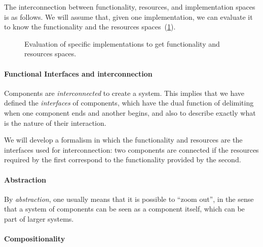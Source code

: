 The interconnection between functionality, resources, and implementation spaces
is as follows. We will assume that, given one implementation, we can evaluate it
to know the functionality and the resources spaces~(\cref{fig:FIR}).

\begin{figure}[h!]
    \centering
    \caption{Evaluation of specific implementations to get functionality and resources spaces.\label{fig:FIR}}
\end{figure}



\paragraph{Functional Interfaces and interconnection}

Components are \emph{interconnected} to create a system.
This implies that we have defined the \emph{interfaces} of components, which
have the dual function of delimiting when one component ends and another begins,
and also to describe exactly what is the nature of their interaction.

We will develop  a formalism in which the functionality and resources
are the interfaces used for interconnection: two components are connected
if the resources required by the first correspond to the functionality
provided by the second.


\paragraph{Abstraction}

By \emph{abstraction}, one usually means that it is possible to ``zoom out'',
in the sense that a system of components can be seen as a component itself,
which can be part of larger systems.



\paragraph{Compositionality}

